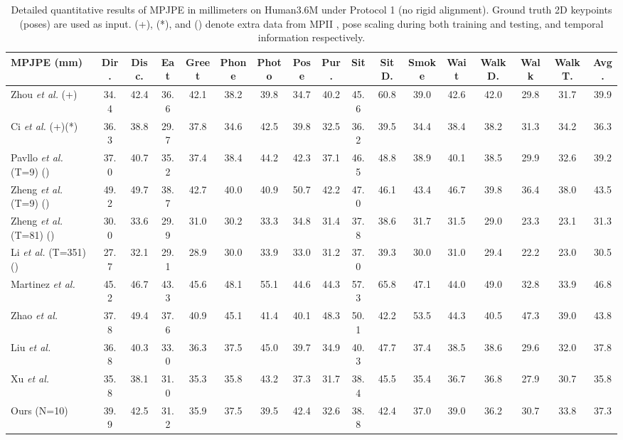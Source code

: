 \documentclass[letterpaper, 10 pt, conference]{ieeeconf}
\begin{document}
\begin{table*}[t]
    \centering
    \resizebox{\textwidth}{!}
    {
    \begin{tabular}{l|ccccccccccccccc|c}
        \toprule
        MPJPE (mm) & Dir. & Disc. & Eat & Greet & Phone & Photo & Pose & Pur. & Sit & SitD. & Smoke & Wait & WalkD. & Walk & WalkT. & \textbf{Avg.} \\
        \hline
        Zhou \textit{et al.} \cite{zhou2019hemlets} (+)& 34.4 & 42.4 & 36.6 & 42.1 & 38.2 & 39.8 & 34.7 & 40.2 & 45.6 & 60.8 & 39.0 & 42.6 & 42.0 & 29.8 & 31.7 & 39.9 \\ 
        Ci \textit{et al.} \cite{ci2019optimizing} (+)(*)& 36.3 & 38.8 & 29.7 & 37.8 & 34.6 & 42.5 & 39.8 & 32.5 & 36.2 & 39.5 & 34.4 & 38.4 & 38.2 & 31.3 & 34.2 & 36.3 \\
        \hline
        Pavllo \textit{et al.} \cite{pavllo20193d} (T=9) ()  & 37.0 & 40.7 & 35.2 & 37.4 & 38.4 & 44.2 & 42.3 & 37.1 & 46.5 & 48.8 & 38.9 & 40.1 & 38.5 & 29.9 & 32.6 &39.2\\ 
        Zheng \textit{et al.} \cite{zheng20213d} (T=9) ()& 49.2 & 49.7 & 38.7 & 42.7 & 40.0 & 40.9 & 50.7 & 42.2 & 47.0 & 46.1 & 43.4 & 46.7 & 39.8 & 36.4 & 38.0 & 43.5 \\
        Zheng \textit{et al.} \cite{zheng20213d} (T=81) () & 30.0 & 33.6 & 29.9&  31.0& 30.2& 33.3 &34.8& 31.4& 37.8 &38.6& 31.7 &31.5 &29.0 &23.3& 23.1& 31.3\\
        Li \textit{et al.} \cite{li2022mhformer} (T=351) () &27.7 &32.1& 29.1& 28.9 &30.0& 33.9 &33.0 &31.2& 37.0& 39.3 &30.0 &31.0& 29.4& 22.2 &23.0& 30.5\\

       \midrule
           Martinez \textit{et al.} \cite{martinez2017simple}& 45.2&46.7&43.3&45.6&48.1 & 55.1 & 44.6 & 44.3 & 57.3 & 65.8 & 47.1 & 44.0 & 49.0 &  32.8& 33.9&46.8 \\ 
           Zhao \textit{et al.} \cite{zhao2019semantic}& 37.8&49.4&37.6&40.9&45.1 & 41.4 & 40.1 & 48.3 & 50.1 & 42.2 & 53.5 & 44.3 & 40.5 &  47.3& 39.0&43.8 \\ 
               Liu \textit{et al.} \cite{liu2020comprehensive}& 36.8&40.3&33.0&36.3&37.5 & 45.0 & 39.7 & 34.9 & 40.3 & 47.7 & 37.4 & 38.5 & 38.6 & 29.6& 32.0&37.8 \\ 
                   Xu \textit{et al.} \cite{xu2021graph}& 35.8&38.1&31.0&35.3&35.8 & 43.2 & 37.3 & 31.7 & 38.4 & 45.5 & 35.4 & 36.7 & 36.8 & 27.9& 30.7&35.8 \\ 
        \midrule
        Ours (N=10) & 39.9 & 42.5 & 31.2 & 35.9 & 37.5 & 39.5 & 42.4 & 32.6 & 38.8 & 42.4 & 37.0  &39.0 & 36.2& 30.7 &33.8 & 37.3 \\
        \bottomrule
    \end{tabular}
    }
    \caption{Detailed quantitative results of MPJPE in millimeters on Human3.6M under Protocol 1 (no rigid alignment). Ground truth 2D keypoints (poses) are used as input. (+), (*), and ()  denote extra data from MPII \cite{agarwal2005recovering}, pose scaling during both training and testing, and temporal information respectively.}
    \label{tab:gt}
    \vspace{-10pt}
\end{table*} 
\end{document}
